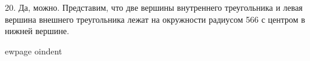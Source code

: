 20. Да, можно. Представим, что две вершины внутреннего треугольника и левая вершина внешнего треугольника лежат на окружности радиусом 566 с центром в нижней вершине.
\begin{figure}[ht!]
\end{figure}
ewpage
oindent
